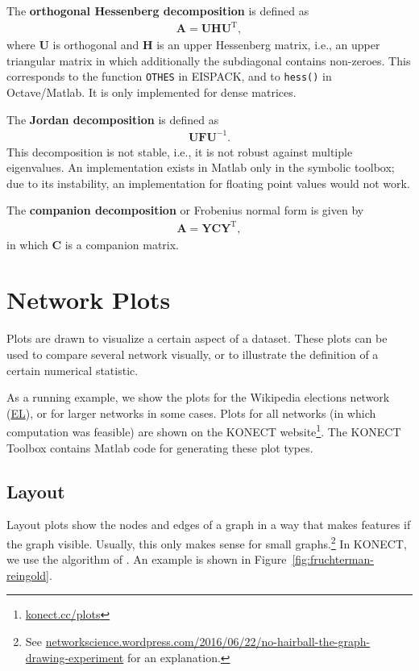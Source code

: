 \documentclass{article}
\begin{document}
The \textbf{orthogonal Hessenberg decomposition} \citep{b139} is defined
as
\begin{align*}
  \mathbf A = \mathbf U \mathbf H \mathbf U^{\mathrm T},
\end{align*}
where $\mathbf U$ is orthogonal and $\mathbf H$ is an upper Hessenberg
matrix, i.e., an upper triangular matrix in which additionally the
subdiagonal contains non-zeroes.  This corresponds to the function
\texttt{OTHES} in EISPACK, and to \texttt{hess()} in Octave/Matlab.  It
is only implemented for dense matrices. 

The \textbf{Jordan decomposition} is defined as
\begin{align*}
  \textbf{U} \textbf{F} \textbf{U}^{-1}.
\end{align*}
This decomposition is not stable, i.e., it is not robust against
multiple eigenvalues. 
An implementation exists in Matlab only in the symbolic toolbox; due to its
instability, an implementation for floating point values would not
work. 

The \textbf{companion decomposition} or Frobenius normal form
\citep[p.\ 19]{b136} is given by
\begin{align*}
  \mathbf A = \mathbf Y \mathbf C \mathbf Y^{\mathrm T},
\end{align*} 
in which $\mathbf C$ is a companion matrix.

\section{Network Plots}
\label{sec:plots}
Plots are drawn to visualize a certain aspect of a dataset. These plots
can be used to compare several network visually, or to illustrate the
definition of a certain numerical statistic.

As a running example, we show the plots for the Wikipedia elections
network
(\href{http://konect.cc/networks/elec/}{\textsf{EL}}), or for larger
networks in some cases.  Plots
for all networks (in which computation was feasible) are shown on the
KONECT
website\footnote{\href{http://konect.cc/plots/}{konect.cc/plots}}. The
KONECT Toolbox contains Matlab code for generating these plot types.

\subsection{Layout}
Layout plots show the nodes and edges of a graph in a way that makes
features if the graph visible.  Usually, this only makes sense for small
graphs.\footnote{See
  \href{https://networkscience.wordpress.com/2016/06/22/no-hairball-the-graph-drawing-experiment/}{networkscience.wordpress.com/2016/06/22/no-hairball-the-graph-drawing-experiment}
  for an explanation.}
In KONECT, we use the algorithm of \cite{b870}.  An
example is shown in Figure~\ref{fig:fruchterman-reingold}.
\end{document}
